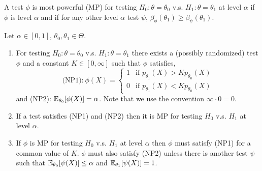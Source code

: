 \begin{definition}
	A test $\phi$ is most powerful (MP) for testing $H_0 : \theta = \theta_0$ v.s. $H_1 : \theta = \theta_1$ at level $\alpha$ if $\phi$ is level $\alpha$ and if for any other level $\alpha$ test $\psi$, $\beta_\phi(\theta_1) \geq \beta_\psi(\theta_1)$.
\end{definition}

\begin{theorem}
	Let $\alpha \in [0, 1]$, $\theta_0, \theta_1 \in \Theta$.
	\begin{enumerate}
		\item[(i)] For testing $H_0 : \theta = \theta_0$ v.s. $H_1 : \theta = \theta_1$ there exists a (possibly randomized) test $\phi$ and a constant $K \in [0, \infty]$ such that $\phi$ satisfies, \[
			\text{(NP1):} \ \phi(X) = \begin{cases}
				1 &\text{if } p_{\theta_1}(X) > Kp_{\theta_0}(X) \\
				0 &\text{if } p_{\theta_1}(X) < Kp_{\theta_0}(X) 
			\end{cases}
		\] and (NP2): $\mathbb{E}_{\theta_0}[\phi(X)] = \alpha$. Note that we use the convention $\infty \cdot 0 = 0$. 
		
		\item[(ii)] If a test satisfies (NP1) and (NP2) then it is MP for testing $H_0$ v.s. $H_1$ at level $\alpha$. 
		
		\item[(iii)] If $\phi$ is MP for testing $H_0$ v.s. $H_1$ at level $\alpha$ then $\phi$ must satisfy (NP1) for a common value of $K$. $\phi$ must also satisfy (NP2) unless there is another test $\psi$ such that $\mathbb{E}_{\theta_0}[\psi(X)] \leq \alpha$ and $\mathbb{E}_{\theta_1}[\psi(X)] = 1$. 
	\end{enumerate}
\end{theorem}

